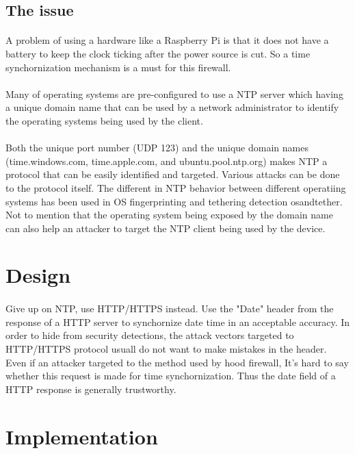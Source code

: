 \documentclass[mscthesis]{usiinfthesis}
\begin{document}
\subsection{The issue}
\paragraph{}
A problem of using a hardware like a Raspberry Pi is that it does not have a battery to keep the clock ticking after the power source is cut. So a time synchornization mechanism is a must for this firewall.
\paragraph{}
Many of operating systems are pre-configured to use a NTP server which having a unique domain name that can be used by a network administrator to identify the operating systems being used by the client.
\paragraph{}
Both the unique port number (UDP 123) and the unique domain names (time.windows.com, time.apple.com, and ubuntu.pool.ntp.org) makes NTP a protocol that can be easily identified and targeted. Various attacks can be done to the protocol itself\citep{ntp:attack}. The different in NTP behavior between different operatiing systems has been used in OS fingerprinting and tethering detection {osandtether}. Not to mention that the operating system being exposed by the domain name can also help an attacker to target the NTP client being used by the device.

\section{Design}
\paragraph{}
Give up on NTP, use HTTP/HTTPS instead. Use the "Date" header from the response of a HTTP server to synchornize date time in an acceptable accuracy. In order to hide from security detections, the attack vectors targeted to HTTP/HTTPS protocol usuall do not want to make mistakes in the header. Even if an attacker targeted to the method used by hood firewall, It's hard to say whether this request is made for time synchornization. Thus the date field of a HTTP response is generally trustworthy.

\section{Implementation}
\end{document}
